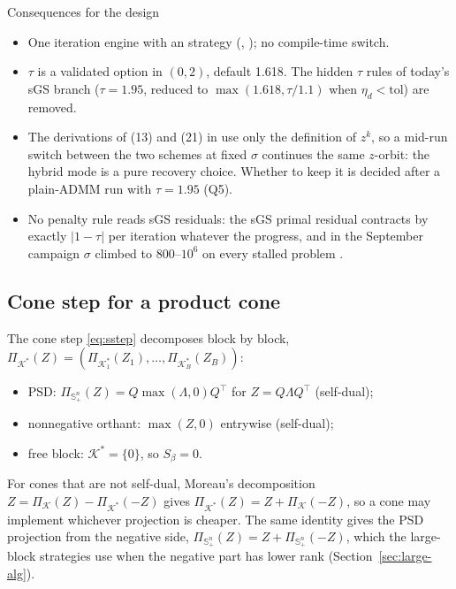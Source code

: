 \documentclass[11pt]{article}
\newcommand{\Sym}{\mathbb{S}}
\newcommand{\K}{\mathcal{K}}
\newcommand{\Kd}{\mathcal{K}^{*}}
\newcommand{\Proj}{\Pi}
\begin{document}
\begin{decision}{Consequences for the design}
\begin{itemize}[leftmargin=*]
  \item One iteration engine with an  strategy (, ); no
  compile-time switch.
  \item $\tau$ is a validated option in $(0,2)$, default 1.618. The hidden $\tau$ rules of today's sGS branch
  ($\tau=1.95$, reduced to $\max(1.618,\tau/1.1)$ when $\eta_d<\text{tol}$) are removed.
  \item The derivations of (13) and (21) in \cite{afterimage} use only the definition of $z^k$, so a mid-run
  switch between the two schemes at fixed $\sigma$ continues the same $z$-orbit: the hybrid mode is a pure
  recovery choice. Whether to keep it is decided after a plain-ADMM run with $\tau=1.95$ (Q5).
  \item No penalty rule reads sGS residuals: the sGS primal residual contracts by exactly $|1-\tau|$ per
  iteration whatever the progress, and in the September campaign $\sigma$ climbed to $800$--$10^6$ on every
  stalled problem \cite{review20}.
\end{itemize}
\end{decision}

\subsection{Cone step for a product cone}
The cone step \eqref{eq:sstep} decomposes block by block,
$\Proj_{\Kd}(Z) = (\Proj_{\Kd_1}(Z_1),\dots,\Proj_{\Kd_B}(Z_B))$:
\begin{itemize}
  \item PSD: $\Proj_{\Sym^n_+}(Z) = Q\max(\Lambda,0)Q^{\top}$ for $Z = Q\Lambda Q^{\top}$ (self-dual);
  \item nonnegative orthant: $\max(Z,0)$ entrywise (self-dual);
  \item free block: $\Kd = \{0\}$, so $S_\beta = 0$.
\end{itemize}
For cones that are not self-dual, Moreau's decomposition $Z = \Proj_{\K}(Z) - \Proj_{\Kd}(-Z)$ gives
$\Proj_{\Kd}(Z) = Z + \Proj_{\K}(-Z)$, so a cone may implement whichever projection is cheaper. The same
identity gives the PSD projection from the negative side, $\Proj_{\Sym^n_+}(Z) = Z + \Proj_{\Sym^n_+}(-Z)$,
which the large-block strategies use when the negative part has lower rank (Section~\ref{sec:large-alg}).
\end{document}
